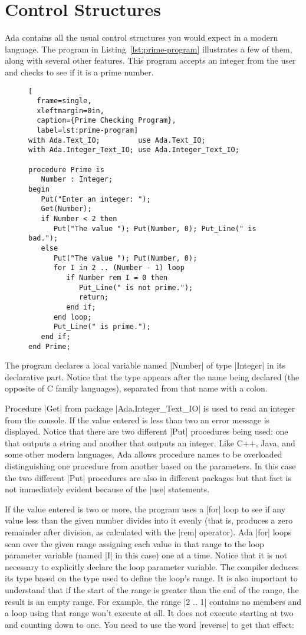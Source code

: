 \section{Control Structures}
\label{sec:control-structures}

Ada contains all the usual control structures you would expect in a modern language. The program
in Listing~\ref{lst:prime-program} illustrates a few of them, along with several other features.
This program accepts an integer from the user and checks to see if it is a prime number.

\begin{figure}[tbhp]
\begin{lstlisting}[
  frame=single,
  xleftmargin=0in,
  caption={Prime Checking Program},
  label=lst:prime-program]
with Ada.Text_IO;         use Ada.Text_IO;
with Ada.Integer_Text_IO; use Ada.Integer_Text_IO;

procedure Prime is
   Number : Integer;
begin
   Put("Enter an integer: ");
   Get(Number);
   if Number < 2 then
      Put("The value "); Put(Number, 0); Put_Line(" is bad.");
   else
      Put("The value "); Put(Number, 0);
      for I in 2 .. (Number - 1) loop
         if Number rem I = 0 then
            Put_Line(" is not prime.");
            return;
         end if;
      end loop;
      Put_Line(" is prime.");
   end if;
end Prime;
\end{lstlisting}    
\end{figure}

The program declares a local variable named |Number| of type |Integer| in its declarative part.
Notice that the type appears after the name being declared (the opposite of C family languages),
separated from that name with a colon.

Procedure |Get| from package |Ada.Integer_Text_IO| is used to read an integer from the console.
If the value entered is less than two an error message is displayed. Notice that there are two
different |Put| procedures being used: one that outputs a string and another that outputs an
integer. Like C++, Java, and some other modern languages, Ada allows procedure names to be
overloaded distinguishing one procedure from another based on the parameters. In this case the
two different |Put| procedures are also in different packages but that fact is not immediately
evident because of the |use| statements.

If the value entered is two or more, the program uses a |for| loop to see if any value less than
the given number divides into it evenly (that is, produces a zero remainder after division, as
calculated with the |rem| operator). Ada |for| loops scan over the given range assigning each
value in that range to the loop parameter variable (named |I| in this case) one at a time.
Notice that it is not necessary to explicitly declare the loop parameter variable. The compiler
deduces its type based on the type used to define the loop's range. It is also important to
understand that if the start of the range is greater than the end of the range, the result is an
empty range. For example, the range |2 .. 1| contains no members and a loop using that range
won't execute at all. It does not execute starting at two and counting down to one. You need to
use the word |reverse| to get that effect:

